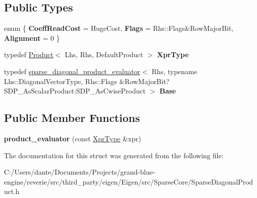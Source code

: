 \subsection*{Public Types}
\begin{DoxyCompactItemize}
\item 
\mbox{\label{struct_eigen_1_1internal_1_1product__evaluator_3_01_product_3_01_lhs_00_01_rhs_00_01_default_pro850b56c5eb8e297547f40d125e705127_a02ec1242fdccfef34a3448c0f8d0e608}} 
enum \{ {\bfseries Coeff\+Read\+Cost} = Huge\+Cost, 
{\bfseries Flags} = Rhs\+::Flags\&Row\+Major\+Bit, 
{\bfseries Alignment} = 0
 \}
\item 
\mbox{\label{struct_eigen_1_1internal_1_1product__evaluator_3_01_product_3_01_lhs_00_01_rhs_00_01_default_pro850b56c5eb8e297547f40d125e705127_a1c266fa49360eaf2366037c1fc512b85}} 
typedef \mbox{\hyperlink{class_eigen_1_1_product}{Product}}$<$ Lhs, Rhs, Default\+Product $>$ {\bfseries Xpr\+Type}
\item 
\mbox{\label{struct_eigen_1_1internal_1_1product__evaluator_3_01_product_3_01_lhs_00_01_rhs_00_01_default_pro850b56c5eb8e297547f40d125e705127_af5caa47759bf7be1acf10ae00d06e6df}} 
typedef \mbox{\hyperlink{struct_eigen_1_1internal_1_1sparse__diagonal__product__evaluator}{sparse\+\_\+diagonal\+\_\+product\+\_\+evaluator}}$<$ Rhs, typename Lhs\+::\+Diagonal\+Vector\+Type, Rhs\+::\+Flags \&Row\+Major\+Bit?S\+D\+P\+\_\+\+As\+Scalar\+Product\+:\+S\+D\+P\+\_\+\+As\+Cwise\+Product $>$ {\bfseries Base}
\end{DoxyCompactItemize}
\subsection*{Public Member Functions}
\begin{DoxyCompactItemize}
\item 
\mbox{\label{struct_eigen_1_1internal_1_1product__evaluator_3_01_product_3_01_lhs_00_01_rhs_00_01_default_pro850b56c5eb8e297547f40d125e705127_ac00f95a6488449a50384d3c054726ce2}} 
{\bfseries product\+\_\+evaluator} (const \mbox{\hyperlink{class_eigen_1_1_product}{Xpr\+Type}} \&xpr)
\end{DoxyCompactItemize}


The documentation for this struct was generated from the following file\+:\begin{DoxyCompactItemize}
\item 
C\+:/\+Users/dante/\+Documents/\+Projects/grand-\/blue-\/engine/reverie/src/third\+\_\+party/eigen/\+Eigen/src/\+Sparse\+Core/Sparse\+Diagonal\+Product.\+h\end{DoxyCompactItemize}
